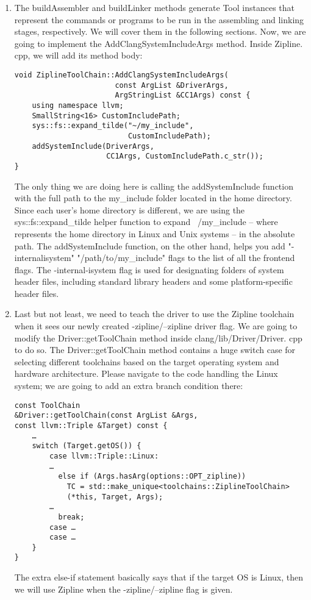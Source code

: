 \begin{enumerate}
\item The buildAssembler and buildLinker methods generate Tool instances that represent the commands or programs to be run in the assembling and linking stages, respectively. We will cover them in the following sections. Now, we are going to implement the AddClangSystemIncludeArgs method. Inside Zipline. cpp, we will add its method body:

\begin{lstlisting}[style=styleCXX]
void ZiplineToolChain::AddClangSystemIncludeArgs(
                       const ArgList &DriverArgs,
                       ArgStringList &CC1Args) const {
	using namespace llvm;
	SmallString<16> CustomIncludePath;
	sys::fs::expand_tilde("~/my_include",
	                      CustomIncludePath);
	addSystemInclude(DriverArgs,
	                 CC1Args, CustomIncludePath.c_str());
}
\end{lstlisting}

The only thing we are doing here is calling the addSystemInclude function with the full path to the my\_include folder located in the home directory. Since each user's home directory is different, we are using the sys::fs::expand\_tilde helper function to expand ~/my\_include – where ~ represents the home directory in Linux and Unix systems – in the absolute path. The addSystemInclude function, on the other hand, helps you add "-internalisystem" "/path/to/my\_include" flags to the list of all the frontend flags. The -internal-isystem flag is used for designating folders of system header files, including standard library headers and some platform-specific header files.

\item Last but not least, we need to teach the driver to use the Zipline toolchain when it sees our newly created -zipline/--zipline driver flag. We are going to modify the Driver::getToolChain method inside clang/lib/Driver/Driver. cpp to do so. The Driver::getToolChain method contains a huge switch case for selecting different toolchains based on the target operating system and hardware architecture. Please navigate to the code handling the Linux system; we are going to add an extra branch condition there:

\begin{lstlisting}[style=styleCXX]
const ToolChain
&Driver::getToolChain(const ArgList &Args,
const llvm::Triple &Target) const {
	…
	switch (Target.getOS()) {
		case llvm::Triple::Linux:
		…
		  else if (Args.hasArg(options::OPT_zipline))
		    TC = std::make_unique<toolchains::ZiplineToolChain>
		    (*this, Target, Args);
		…
		  break;
		case …
		case …
	}
}
\end{lstlisting}

The extra else-if statement basically says that if the target OS is Linux, then we will use Zipline when the -zipline/--zipline flag is given.

\end{enumerate}

